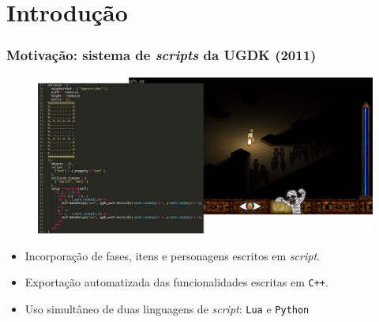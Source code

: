 \documentclass[brazil]{beamer}
\begin{document}
\section{Introdução}
\begin{frame}[fragile]
  \frametitle{Motivação: sistema de \textit{scripts} da UGDK (2011)}
  \pause
  \begin{figure}
    \includegraphics[width=.9\textwidth]{images/horus+sublime.png}
  \end{figure}
  \vspace{-10pt}
  \begin{itemize}
    \pause
    \item Incorporação de fases, itens e personagens escritos em \textit{script}.
    \pause
    \item Exportação automatizada das funcionalidades escritas em \texttt{C++}.
    \pause
    \item Uso simultâneo de duas linguagens de \textit{script}: \texttt{Lua} e \texttt{Python}
  \end{itemize}
\end{frame}
\end{document}
